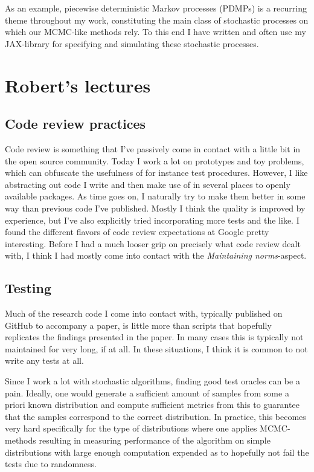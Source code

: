 \documentclass[11pt]{diazessay}
\begin{document}
As an example, piecewise deterministic Markov processes (PDMPs) is a recurring theme throughout my work, constituting the main class of stochastic processes on which our MCMC-like methods rely. To this end I have written and often use my JAX-library for specifying and simulating these stochastic processes.

\section*{Robert's lectures}

\subsection*{Code review practices}

Code review is something that I've passively come in contact with a little bit in the open source community. Today I work a lot on prototypes and toy problems, which can obfuscate the usefulness of for instance test procedures. However, I like abstracting out code I write and then make use of in several places to openly available packages. As time goes on, I naturally try to make them better in some way than previous code I've published. Mostly I think the quality is improved by experience, but I've also explicitly tried incorporating more tests and the like. I found the different flavors of code review expectations at Google pretty interesting. Before I had a much looser grip on precisely what code review dealt with, I think I had mostly come into contact with the \textit{Maintaining norms}-aspect.

\subsection*{Testing}

Much of the research code I come into contact with, typically published on GitHub to accompany a paper, is little more than scripts that hopefully replicates the findings presented in the paper. In many cases this is typically not maintained for very long, if at all. In these situations, I think it is common to not write any tests at all.

Since I work a lot with stochastic algorithms, finding good test oracles can be a pain. Ideally, one would generate a sufficient amount of samples from some a priori known distribution and compute sufficient metrics from this to guarantee that the samples correspond to the correct distribution. In practice, this becomes very hard specifically for the type of distributions where one applies MCMC-methods resulting in measuring performance of the algorithm on simple distributions with large enough computation expended as to hopefully not fail the tests due to randomness. 
\end{document}
